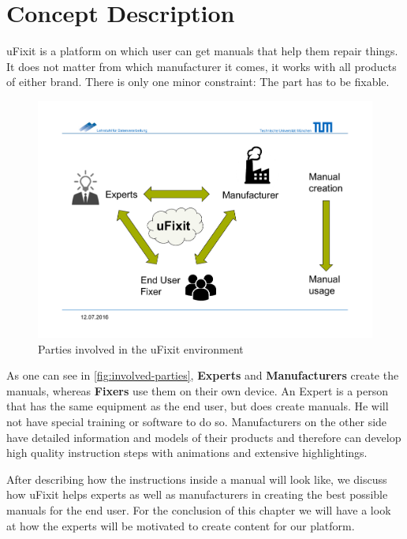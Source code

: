 
\chapter{Concept Description}

	uFixit is a platform on which user can get manuals that help them repair things. It does not matter from which manufacturer it comes, it works with all products of either brand. There is only one minor constraint: The part has to be fixable.
	
	\begin{figure}[H]
		\includegraphics[width=\textwidth, trim=0cm 3cm 0cm 4cm, clip]{../images/involved-parties.pdf}
		\centering
		\caption{Parties involved in the uFixit environment}
		\label{fig:involved-parties}
	\end{figure}

	As one can see in \autoref{fig:involved-parties}, \textbf{Experts} and \textbf{Manufacturers} create the manuals, whereas \textbf{Fixers} use them on their own device. An Expert is a person that has the same equipment as the end user, but does create manuals. He will not have special training or software to do so. Manufacturers on the other side have detailed information and models of their products and therefore can develop high quality instruction steps with animations and extensive highlightings.
	
	After describing how the instructions inside a manual will look like, we discuss how uFixit helps experts as well as manufacturers in creating the best possible manuals for the end user. For the conclusion of this chapter we will have a look at how the experts will be motivated to create content for our platform.


